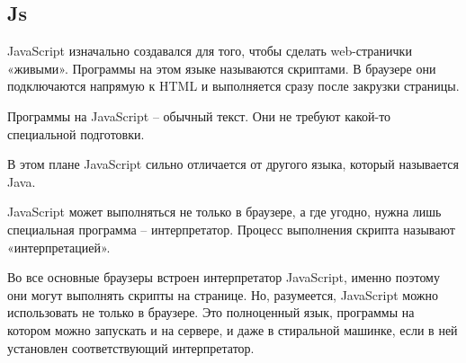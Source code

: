 \subsection{Js}

JavaScript изначально создавался для того, чтобы сделать web-странички «живыми». Программы на этом языке называются скриптами. В браузере они подключаются напрямую к HTML и выполняется сразу после закрузки страницы.

Программы на JavaScript – обычный текст. Они не требуют какой-то специальной подготовки.

В этом плане JavaScript сильно отличается от другого языка, который называется Java.

JavaScript может выполняться не только в браузере, а где угодно, нужна лишь специальная программа – интерпретатор. Процесс выполнения скрипта называют «интерпретацией».

Во все основные браузеры встроен интерпретатор JavaScript, именно поэтому они могут выполнять скрипты на странице. Но, разумеется, JavaScript можно использовать не только в браузере. Это полноценный язык, программы на котором можно запускать и на сервере, и даже в стиральной машинке, если в ней установлен соответствующий интерпретатор.